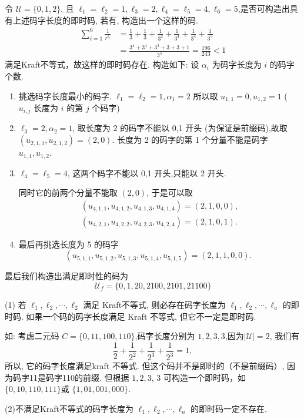 \begin{example}
    令 $ \mathscr{U}=\{0,1,2\} $, 且 $ \ell_{1}=\ell_{2}=1, \ell_{3}=2, \ell_{4}=\ell_{5}=4, \ell_{6}=5 $,是否可构造出具有上述码字长度的即时码, 若有, 构造出一个这样的码.
$$
\begin{aligned}
\sum_{i=1}^{6} \frac{1}{r^{\ell_{i}}}&=\frac{1}{3}+\frac{1}{3}+\frac{1}{3^{2}}+\frac{1}{3^{4}}+\frac{1}{3^{4}}+\frac{1}{3^{5}} \\
&=\frac{3^{4}+3^{4}+3^{3}+3+3+1}{3^{5}}=\frac{196}{243}<1
\end{aligned}
$$
满足Kraft不等式，故这样的即时码存在. 构造如下: 设 $ \alpha_{i} $ 为码字长度为 $ i $ 的码字个数.
\begin{enumerate}
    \item 挑选码字长度最小的码字. $ \ell_{1}=\ell_{2}=1, \alpha_{1}=2 $
所以取 $ u_{1,1}=0, u_{1,2}=1 $
( $ u_{i, j} $ 长度为 $ i $ 的第 $ j $ 个码字)
    \item $ \ell_{3}=2, \alpha_{2}=1 $, 取长度为 2 的码字不能以 0,1 开头 (为保证是前缀码),故取 $ \left(u_{2,1,1}, u_{2,1,2}\right)=(2,0) $. 长度为 2 的码字的第 1 个分量不能是码字 $ u_{1,1}, u_{1,2} $.
    \item $ \ell_{4}=\ell_{5}=4 $, 这两个码字不能以 0,1 开头,只能以 2 开头.

同时它的前两个分量不能取 $ (2,0) $, 于是可以取
$$
\begin{array}{l}
\left(u_{4,1,1}, u_{4,1,2}, u_{4,1,3}, u_{4,1,4}\right)=(2,1,0,0), \\
\left(u_{4,2,1}, u_{4,2,2}, u_{4,2,3}, u_{4,2,4}\right)=(2,1,0,1) .
\end{array}
$$
    \item 最后再挑选长度为 5 的码字
$$
\left(u_{5,1,1}, u_{5,1,2}, u_{5,1,3}, u_{5,1,4}, u_{5,1,5}\right)=(2,1,1,0,0) \text {. }
$$
\end{enumerate}
最后我们构造出满足即时性的码为
$$\mathscr{U}_f=\{0,1,20,2100,2101,21100\}$$
\end{example}

\begin{remark}

(1) 若 $ \ell_{1}, \ell_{2}, \cdots, \ell_{2} $ 满足 Kraft不等式, 则必存在码字长度为 $ \ell_{1}, \ell_{2}, \cdots, \ell_{a} $ 的即时码. 如果一个码的码字长度满足 Kraft 不等式, 但它不一定是即时码.

如: 考虑二元码 $ C=\{0,11,100,110\} $,码字长度分别为 $ 1,2,3,3 $,因为$|\mathscr{U}|=2$, 我们有
$$
\frac{1}{2}+\frac{1}{2^{2}}+\frac{1}{2^{3}}+\frac{1}{2^{3}}=1,
$$
所以, 它的码字长度满足kraft 不等式.
但这个码并不是即时的（不是前缀码）, 因为码字11是码字110的前缀.
但根据 $ 1,2,3 $, 3 可构造一个即时码，如 $ \{0,10,110,111\} $或 $ \{1,01,001,000\} $.

(2)不满足Kraft不等式的码字长度为 $ \ell_{1}, \ell_{2}, \cdots, \ell_{a} $ 的即时码一定不存在.
\end{remark}






